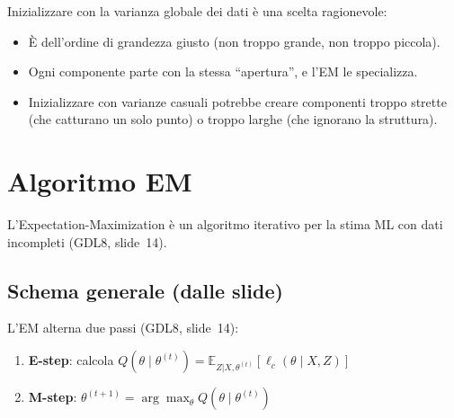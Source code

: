 \documentclass[11pt,a4paper]{article}
\newcommand{\refslide}[2]{\textsc{#1}, slide~#2}
\begin{document}
\begin{infobox}
Inizializzare con la varianza globale dei dati è una scelta ragionevole:
\begin{itemize}[nosep]
  \item È dell'ordine di grandezza giusto (non troppo grande, non
        troppo piccola).
  \item Ogni componente parte con la stessa ``apertura'', e l'EM
        le specializza.
  \item Inizializzare con varianze casuali potrebbe creare componenti
        troppo strette (che catturano un solo punto) o troppo larghe
        (che ignorano la struttura).
\end{itemize}
\end{infobox}

\section{Algoritmo EM}\label{sec:em}

L'Expectation-Maximization \`{e} un algoritmo iterativo per la stima ML
con dati incompleti (\refslide{GDL8}{14}).

\subsection{Schema generale (dalle slide)}

L'EM alterna due passi (\refslide{GDL8}{14}):
\begin{enumerate}
  \item \textbf{E-step}: calcola $Q(\theta \mid \theta^{(t)}) =
        \mathbb{E}_{Z|X,\theta^{(t)}}[\ell_c(\theta \mid X, Z)]$
  \item \textbf{M-step}: $\theta^{(t+1)} = \arg\max_\theta
        Q(\theta \mid \theta^{(t)})$
\end{enumerate}
\end{document}
